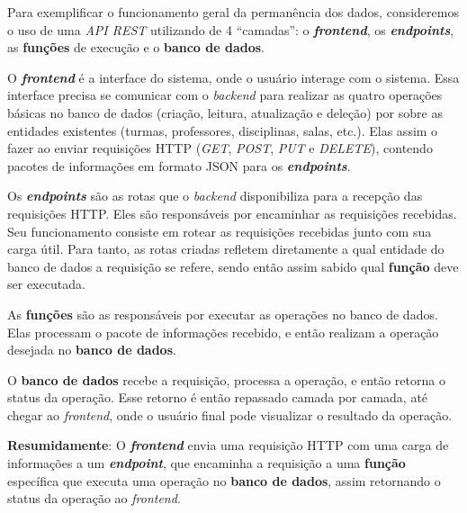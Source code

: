 Para exemplificar o funcionamento geral da permanência dos dados, consideremos o uso de uma \textit{API REST} utilizando de 4 ``camadas'': o \textbf{\textit{frontend}}, os \textbf{\textit{endpoints}}, as \textbf{funções} de execução e o \textbf{banco de dados}.


O \textbf{\textit{frontend}} é a interface do sistema, onde o usuário interage com o sistema. Essa interface precisa se comunicar com o \textit{backend} para realizar as quatro operações básicas no banco de dados (criação, leitura, atualização e deleção) por sobre as entidades existentes (turmas, professores, disciplinas, salas, etc.). Elas assim o fazer ao enviar requisições HTTP (\textit{GET}, \textit{POST}, \textit{PUT} e \textit{DELETE}), contendo pacotes de informações em formato JSON para os \textbf{\textit{endpoints}}.

Os \textbf{\textit{endpoints}} são as rotas que o \textit{backend} disponibiliza para a recepção das requisições HTTP. Eles são responsáveis por encaminhar as requisições recebidas. Seu funcionamento consiste em rotear as requisições recebidas junto com sua carga útil. Para tanto, as rotas criadas refletem diretamente a qual entidade do banco de dados a requisição se refere, sendo então assim sabido qual \textbf{função} deve ser executada.

As \textbf{funções} são as responsáveis por executar as operações no banco de dados. Elas processam o pacote de informações recebido, e então realizam a operação desejada no \textbf{banco de dados}.

O \textbf{banco de dados} recebe a requisição, processa a operação, e então retorna o status da operação. Esse retorno é então repassado camada por camada, até chegar ao \textit{frontend}, onde o usuário final pode visualizar o resultado da operação.

\textbf{Resumidamente}: O \textbf{\textit{frontend}} envia uma requisição HTTP com uma carga de informações a um \textbf{\textit{endpoint}}, que encaminha a requisição a uma \textbf{função} específica que executa uma operação no \textbf{banco de dados}, assim retornando o status da operação ao \textit{frontend}.